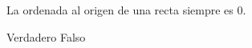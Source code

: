 La ordenada al origen de una recta siempre es 0.

\begin{choices}
    \choice Verdadero
    \CorrectChoice Falso
\end{choices}